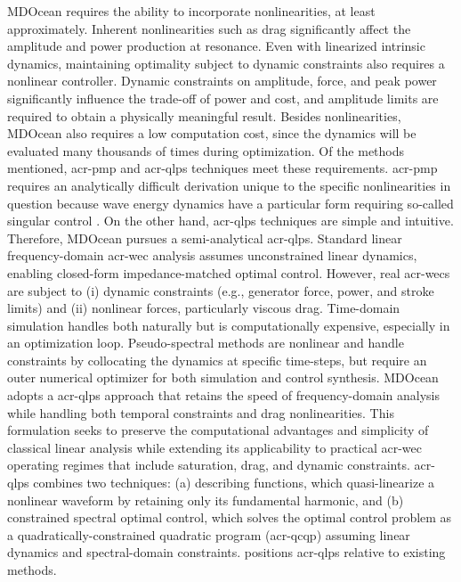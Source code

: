     MDOcean requires the ability to incorporate nonlinearities, at least approximately.
    Inherent nonlinearities such as drag significantly affect the amplitude and power production at resonance.
    Even with linearized intrinsic dynamics, maintaining optimality subject to dynamic constraints also requires a nonlinear controller.
    Dynamic constraints on amplitude, force, and peak power significantly influence the trade-off of power and cost, and amplitude limits are required to obtain a physically meaningful result.
    Besides nonlinearities, MDOcean also requires a low computation cost, since the dynamics will be evaluated many thousands of times during optimization.
    Of the methods mentioned, \gls{acr-pmp} and \gls{acr-qlps} techniques meet these requirements.
    \gls{acr-pmp} requires an analytically difficult derivation unique to the specific nonlinearities in question because wave energy dynamics have a particular form requiring so-called singular control \citep{zou_optimal_2017}.
    On the other hand, \gls{acr-qlps} techniques are simple and intuitive.
    Therefore, MDOcean pursues a semi-analytical \gls{acr-qlps}.
\else
    Standard linear frequency-domain \gls{acr-wec} analysis assumes unconstrained linear dynamics, enabling closed-form impedance-matched optimal control.
    However, real \glspl{acr-wec} are subject to (i) dynamic constraints (e.g., generator force, power, and stroke limits) and (ii) nonlinear forces, particularly viscous drag.
    Time-domain simulation handles both naturally but is computationally expensive, especially in an optimization loop.
    Pseudo-spectral methods are nonlinear and handle constraints by collocating the dynamics at specific time-steps, but require an outer numerical optimizer for both simulation and control synthesis.
\fi
MDOcean adopts a \gls{acr-qlps} approach that retains the speed of frequency-domain analysis while handling both temporal constraints and drag nonlinearities.
This formulation seeks to preserve the computational advantages and simplicity of classical linear analysis while extending its applicability to practical \gls{acr-wec} operating regimes that include saturation, drag, and dynamic constraints.
\gls{acr-qlps} combines two techniques: (a) describing functions, which quasi-linearize a nonlinear waveform by retaining only its fundamental harmonic,
and (b) constrained spectral optimal control, which solves the optimal control problem as a quadratically-constrained quadratic program (\gls{acr-qcqp}) assuming linear dynamics and spectral-domain constraints.
 positions \gls{acr-qlps} relative to existing methods.
